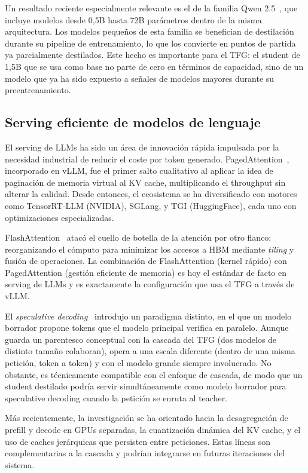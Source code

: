 Un resultado reciente especialmente relevante es el de la familia Qwen 2.5~\cite{qwen2}, que incluye modelos desde 0,5B hasta 72B parámetros dentro de la misma arquitectura. Los modelos pequeños de esta familia se benefician de destilación durante su pipeline de entrenamiento, lo que los convierte en puntos de partida ya parcialmente destilados. Este hecho es importante para el TFG: el student de 1,5B que se usa como base no parte de cero en términos de capacidad, sino de un modelo que ya ha sido expuesto a señales de modelos mayores durante su preentrenamiento.

\subsection{Serving eficiente de modelos de lenguaje}

El serving de LLMs ha sido un área de innovación rápida impulsada por la necesidad industrial de reducir el coste por token generado. PagedAttention~\cite{vllm2023}, incorporado en vLLM, fue el primer salto cualitativo al aplicar la idea de paginación de memoria virtual al KV cache, multiplicando el throughput sin alterar la calidad. Desde entonces, el ecosistema se ha diversificado con motores como TensorRT-LLM (NVIDIA), SGLang, y TGI (HuggingFace), cada uno con optimizaciones especializadas.

FlashAttention~\cite{dao2022flashattention, dao2023flash2} atacó el cuello de botella de la atención por otro flanco: reorganizando el cómputo para minimizar los accesos a HBM mediante \textit{tiling} y fusión de operaciones. La combinación de FlashAttention (kernel rápido) con PagedAttention (gestión eficiente de memoria) es hoy el estándar de facto en serving de LLMs y es exactamente la configuración que usa el TFG a través de vLLM.

El \textit{speculative decoding}~\cite{leviathan2023speculative} introdujo un paradigma distinto, en el que un modelo borrador propone tokens que el modelo principal verifica en paralelo. Aunque guarda un parentesco conceptual con la cascada del TFG (dos modelos de distinto tamaño colaboran), opera a una escala diferente (dentro de una misma petición, token a token) y con el modelo grande siempre involucrado. No obstante, es técnicamente compatible con el enfoque de cascada, de modo que un student destilado podría servir simultáneamente como modelo borrador para speculative decoding cuando la petición se enruta al teacher.

Más recientemente, la investigación se ha orientado hacia la desagregación de prefill y decode en GPUs separadas, la cuantización dinámica del KV cache, y el uso de caches jerárquicas que persisten entre peticiones. Estas líneas son complementarias a la cascada y podrían integrarse en futuras iteraciones del sistema.

